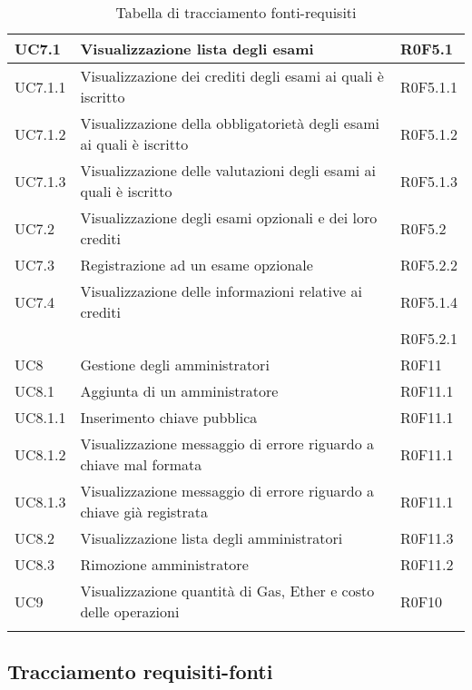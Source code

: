 \documentclass[AnalisiDeiRequisiti.tex]{subfiles}
\begin{document}
\begin{longtable}[H]{|p{2cm}|p{5cm}|p{5cm}|}
	UC7.1 & Visualizzazione lista degli esami & R0F5.1 \\ \hline
	UC7.1.1 & Visualizzazione dei crediti degli esami ai quali è iscritto & R0F5.1.1 \\ \hline
	UC7.1.2 & Visualizzazione della obbligatorietà degli esami ai quali è iscritto & R0F5.1.2 \\ \hline
	UC7.1.3 & Visualizzazione delle valutazioni degli esami ai quali è iscritto	& R0F5.1.3 \\ \hline
	UC7.2 & Visualizzazione degli esami opzionali e dei loro crediti & R0F5.2 \\ \hline
	UC7.3 & Registrazione ad un esame opzionale & R0F5.2.2 \\ \hline
	UC7.4 & Visualizzazione delle informazioni relative ai crediti & R0F5.1.4 \\ 
	& & R0F5.2.1 \\ \hline
	UC8 & Gestione degli amministratori & R0F11 \\ \hline
	UC8.1 & Aggiunta di un amministratore & R0F11.1 \\ \hline
	UC8.1.1 & Inserimento chiave pubblica & R0F11.1 \\ \hline
	UC8.1.2 & Visualizzazione messaggio di errore riguardo a chiave mal formata & R0F11.1 \\ \hline
	UC8.1.3 & Visualizzazione messaggio di errore riguardo a chiave già registrata & R0F11.1 \\ \hline
	UC8.2 & Visualizzazione lista degli amministratori & R0F11.3 \\ \hline
	UC8.3 & Rimozione amministratore & R0F11.2 \\ \hline
	UC9 & Visualizzazione quantità di Gas, Ether e costo delle operazioni & R0F10 \\ \hline

	\caption{Tabella di tracciamento fonti-requisiti}
\end{longtable}

\subsection{Tracciamento requisiti-fonti}
\end{document}
